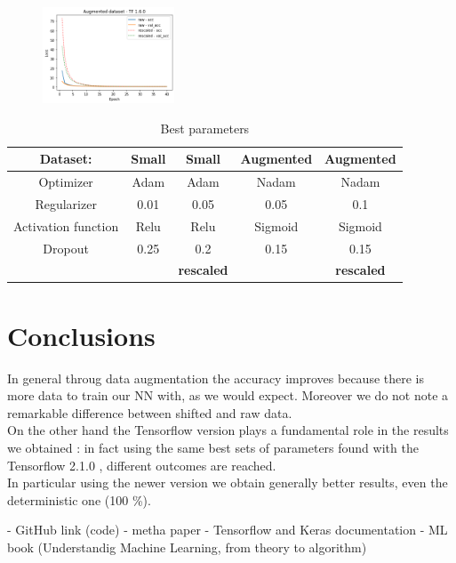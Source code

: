 \documentclass[prl,twocolumn]{revtex4-1}
\begin{document}
\begin{figure}[h!!]
	\includegraphics[width=0.35\textwidth]{aug_oldTFloss.png}
	\caption{}
	\label{fig:y}
\end{figure}
\begin{table}[ht]
\caption{Best parameters}
\begin{tabular}{cc|c|c|c}

\textbf{Dataset:}& \textbf{Small} & \textbf{Small}& \textbf{Augmented}& \textbf{Augmented}  \\ [0.5ex]
\hline
Optimizer & Adam & Adam & Nadam &  Nadam \\
Regularizer & 0.01 & 0.05 & 0.05 & 0.1 \\
Activation function & Relu & Relu & Sigmoid & Sigmoid \\
Dropout & 0.25 & 0.2 & 0.15 & 0.15  \\ [1ex]
\hline
&&\textbf{rescaled}&&\textbf{rescaled} \\
\end{tabular}
\label{table:nonlin}
\end{table}
\section{Conclusions}
In general throug data augmentation the accuracy improves because there is more data to train our NN with, as we would expect. Moreover we do not note a remarkable difference between shifted and raw data. \\ On the other hand the Tensorflow version plays a fundamental role in the results we obtained : in fact using the same best sets of parameters found with the Tensorflow 2.1.0 , different outcomes are reached. \\
In particular using the newer version we obtain generally better results, even the deterministic one (100 \%). 
 


\begin{thebibliography}{99}
- GitHub link (code)
- metha paper
- Tensorflow and Keras documentation
- ML book (Understandig Machine Learning, from theory to algorithm)
\end{thebibliography}
\end{document}
